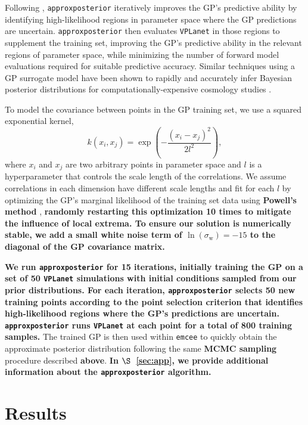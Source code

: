 \documentclass[twocolumn]{aastex62}
\newcommand{\xxx}[1]{{\textbf{#1}}}
\newcommand{\vplanet}[0]{\texttt{VPLanet}\xspace}
\newcommand{\emcee}[0]{\texttt{emcee}\xspace}
\newcommand{\approxposterior}[0]{\texttt{approxposterior}\xspace}
\begin{document}
Following \citet{Kandasamy2017}, \approxposterior iteratively improves the GP's predictive ability by identifying high-likelihood regions in parameter space where the GP predictions are uncertain. \approxposterior then evaluates \vplanet in those regions to supplement the training set, improving the GP's predictive ability in the relevant regions of parameter space, while minimizing the number of forward model evaluations required for suitable predictive accuracy. Similar techniques using a GP surrogate model have been shown to rapidly and accurately infer Bayesian posterior distributions for computationally-expensive cosmology studies \citep[e.g.][]{Bird2019}. 

To model the covariance between points in the GP training set, we use a squared exponential kernel,
\begin{equation} \label{eqn:kernel}
k(x_i, x_j) = \exp \left( - \frac{(x_i - x_j)^2}{2l^2} \right),
\end{equation}
where $x_i$ and $x_j$ are two arbitrary points in parameter space and $l$ is a hyperparameter that controls the scale length of the correlations. We assume correlations in each dimension have different scale lengths and fit for each $l$ by optimizing the GP's marginal likelihood of the training set data using \xxx{Powell's method} \citep{Powell1964}, \xxx{randomly restarting this optimization 10 times to mitigate the influence of local extrema. To ensure our solution is numerically stable, we add a small white noise term of $\ln(\sigma_{\mathrm{w}}) = -15$ to the diagonal of the GP covariance matrix.} 

\xxx{We run \approxposterior for 15 iterations, initially training the GP on a set of 50 \vplanet simulations with initial conditions sampled from our prior distributions. For each iteration, \approxposterior selects 50 new training points according to the \citet{Kandasamy2017} point selection criterion that identifies high-likelihood regions where the GP's predictions are uncertain. \approxposterior runs \vplanet at each point for a total of 800 training samples.} The trained GP is then used within \emcee to quickly obtain the approximate posterior distribution following the same \xxx{MCMC sampling} procedure described \xxx{above}. \xxx{In $\S$~\ref{sec:app}, we provide additional information about the \approxposterior algorithm.}


\section{Results} \label{sec:results}
\end{document}
